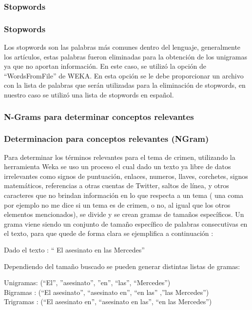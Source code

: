 \documentclass{beamer}
\begin{document}
\subsubsection{Stopwords}
\begin{frame}
\frametitle{Stopwords}
Los stopwords son las palabras m\'{a}s comunes dentro del lenguaje, generalmente los art\'{i}culos, estas palabras fueron eliminadas para la obtenci\'{o}n de los unigramas ya que no aportan informaci\'{o}n. En este caso, se utiliz\'{o} la opci\'{o}n de “WordsFromFile” de WEKA. En esta opci\'{o}n se le debe proporcionar un archivo con la lista de palabras que ser\'{a}n utilizadas para la eliminaci\'{o}n de stopwords, en nuestro caso se utiliz\'{o} una lista de stopwords en espa\~{n}ol. 

\end{frame}


\subsubsection{N-Grams para determinar conceptos relevantes}
\begin{frame}
\frametitle{Determinacion para conceptos relevantes (NGram)}
Para determinar los t\'{e}rminos relevantes para el tema de crimen, utilizando la herramienta Weka se uso un proceso el cual dado un texto ya libre de datos irrelevantes como signos de puntuaci\'{o}n, enlaces, numeros, llaves, corchetes, signos matem\'{a}ticos, referencias a otras cuentas de Twitter, saltos de l\'{i}nea, y otros caracteres que no brindan informaci\'{o}n en lo que respecta a un  tema ( una coma por ejemplo no me dice si un tema es de crimen, o no, al igual que los otros elementos mencionados),  se divide y se crean gramas de tama\~{n}os espec\'{i}ficos. Un grama viene siendo un conjunto de tama\~{n}o espec\'{i}fico de palabras consecutivas en el texto, para que quede de forma clara se ejemplifica a continuaci\'{o}n : 
\end{frame}

\begin{frame}
Dado el texto : “ El asesinato en las Mercedes” 


Dependiendo del tama\~{n}o buscado se pueden generar distintas listas de gramas:
 
Unigramas: (“El”, ”asesinato”, ”en”, “las”, “Mercedes”) \\
Bigramas : (“El asesinato”, “asesinato en”, “en las” ,”las Mercedes”) \\  
Trigramas : (“El asesinato en”, “asesinato en las”, “en las Mercedes”) \\
\end{frame}
\end{document}
